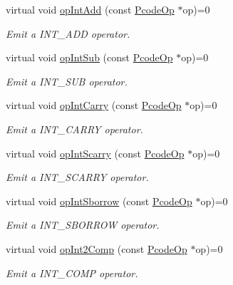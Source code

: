 \begin{DoxyCompactItemize}
virtual void \mbox{\hyperlink{class_print_language_a01509fa3449a4a4e0229f40a5915ae53}{op\+Int\+Add}} (const \mbox{\hyperlink{class_pcode_op}{Pcode\+Op}} $\ast$op)=0
\begin{DoxyCompactList}\small\item\em Emit a I\+N\+T\+\_\+\+A\+DD operator. \end{DoxyCompactList}\item 
virtual void \mbox{\hyperlink{class_print_language_ada09308d7a740766d29d832cb9c76604}{op\+Int\+Sub}} (const \mbox{\hyperlink{class_pcode_op}{Pcode\+Op}} $\ast$op)=0
\begin{DoxyCompactList}\small\item\em Emit a I\+N\+T\+\_\+\+S\+UB operator. \end{DoxyCompactList}\item 
virtual void \mbox{\hyperlink{class_print_language_ab471f38d9e9e670b5d6bfed6b865e98e}{op\+Int\+Carry}} (const \mbox{\hyperlink{class_pcode_op}{Pcode\+Op}} $\ast$op)=0
\begin{DoxyCompactList}\small\item\em Emit a I\+N\+T\+\_\+\+C\+A\+R\+RY operator. \end{DoxyCompactList}\item 
virtual void \mbox{\hyperlink{class_print_language_ac6d54c23989123b330452edd9d6e84ec}{op\+Int\+Scarry}} (const \mbox{\hyperlink{class_pcode_op}{Pcode\+Op}} $\ast$op)=0
\begin{DoxyCompactList}\small\item\em Emit a I\+N\+T\+\_\+\+S\+C\+A\+R\+RY operator. \end{DoxyCompactList}\item 
virtual void \mbox{\hyperlink{class_print_language_a78c175bfef08ad70c5698d0db9730a90}{op\+Int\+Sborrow}} (const \mbox{\hyperlink{class_pcode_op}{Pcode\+Op}} $\ast$op)=0
\begin{DoxyCompactList}\small\item\em Emit a I\+N\+T\+\_\+\+S\+B\+O\+R\+R\+OW operator. \end{DoxyCompactList}\item 
virtual void \mbox{\hyperlink{class_print_language_a21789c608fa86d8dbc60cca0ccfda05b}{op\+Int2\+Comp}} (const \mbox{\hyperlink{class_pcode_op}{Pcode\+Op}} $\ast$op)=0
\begin{DoxyCompactList}\small\item\em Emit a I\+N\+T\+\_\+C\+O\+MP operator. \end{DoxyCompactList}\item 

\end{DoxyCompactItemize}

